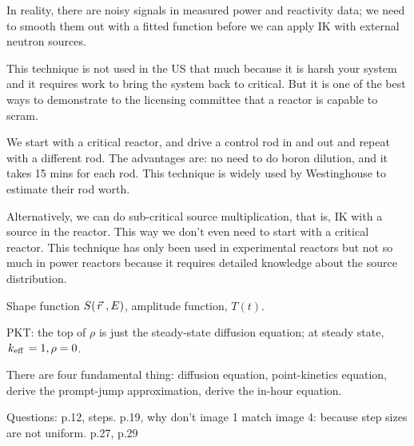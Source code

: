 \documentclass{school-22.211-notes}
\begin{document}
In reality, there are noisy signals in measured power and reactivity data; we need to smooth them out with a fitted function before we can apply IK with external neutron sources. 

This technique is not used in the US that much because it is harsh your system and it requires work to bring the system back to critical. But it is one of the best ways to demonstrate to the licensing committee that a reactor is capable to scram.  

We start with a critical reactor, and drive a control rod in and out and repeat with a different rod. The advantages are: no need to do boron dilution, and it takes 15 mins for each rod. This technique is widely used by Westinghouse to estimate their rod worth. 




Alternatively, we can do sub-critical source multiplication, that is, IK with a source in the reactor. This way we don't even need to start with a critical reactor. This technique has only been used in experimental reactors but not so much in power reactors because it requires detailed knowledge about the source distribution. 



\clearpage
{}
Shape function $S(\left.\vec{r}\right., E)$, amplitude function, $T(t)$. 

PKT: the top of $\rho$ is just the steady-state diffusion equation; at steady state, $\left. k_{\mathrm{eff}} \right. = 1, \rho = 0$. 

There are four fundamental thing: diffusion equation, point-kinetics equation, derive the prompt-jump approximation, derive the in-hour equation. 


Questions:  p.12, steps. 
p.19, why don't image 1 match image 4: because step sizes are not uniform. 
p.27, 
p.29
\end{document}
